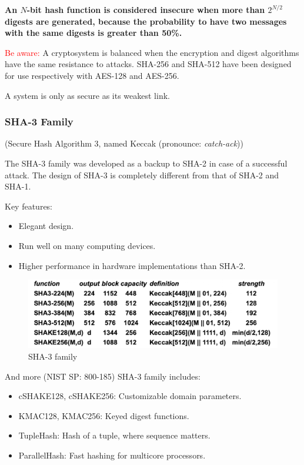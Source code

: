     \textbf{An $N$-bit hash function is considered insecure when more than $2^{N/2}$ digests are generated, because the probability to have two messages with the same digests is greater than 50\%. }

\textcolor{red}{Be aware:} A cryptosystem is balanced when the encryption and digest algorithms have the same resistance to attacks. SHA-256 and SHA-512 have been designed for use respectively with AES-128 and AES-256.

\begin{tcolorbox}[colback=red!10!white, colframe=red!70!black, coltitle=white, title=Beware]
    A system is only as secure as its weakest link.
\end{tcolorbox}

\subsubsection*{SHA-3 Family}
\begin{center}
    (Secure Hash Algorithm 3, named Keccak (pronounce: \textit{catch-ack}))
\end{center}
The SHA-3 family was developed as a backup to SHA-2 in case of a successful attack. The design of SHA-3 is completely different from that of SHA-2 and SHA-1.

\vspace{0.5cm}

\noindent Key features:
\begin{itemize}
    \item Elegant design.
    \item Run well on many computing devices.
    \item Higher performance in hardware implementations than SHA-2.
\end{itemize}

\begin{figure}[H]
    \centering
    \includegraphics[width=0.5\linewidth]{Images/Cryptography/sha_3.png}
    \caption{SHA-3 family}
\end{figure}

\vspace{0.5cm}

And more (NIST SP: 800-185) SHA-3 family includes:
\begin{itemize}
    \item cSHAKE128, cSHAKE256: Customizable domain parameters.
    \item KMAC128, KMAC256: Keyed digest functions.
    \item TupleHash: Hash of a tuple, where sequence matters.
    \item ParallelHash: Fast hashing for multicore processors.
\end{itemize}

